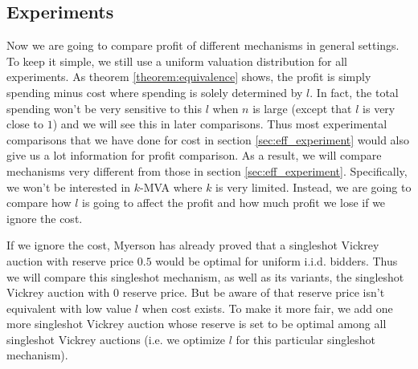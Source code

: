 \subsection{Experiments}

Now we are going to compare profit of different mechanisms in general settings.
To keep it simple, we still use a uniform valuation distribution for all
experiments.  As theorem \ref{theorem:equivalence} shows, the profit is simply
spending minus cost where spending is solely determined by $l$. In fact, the
total spending won't be very sensitive to this $l$ when $n$ is large (except
that $l$ is very close to $1$) and we will see this in later comparisons. Thus
most experimental comparisons that we have done for cost in section
\ref{sec:eff_experiment} would also give us a lot information for profit
comparison. As a result, we will compare mechanisms very different from those
in section \ref{sec:eff_experiment}. Specifically, we won't be interested in
$k$-MVA where $k$ is very limited. Instead, we are going to compare how $l$
is going to affect the profit and how much profit we lose if we ignore the cost.

If we ignore the cost, Myerson has already proved that a singleshot Vickrey
auction with reserve price $0.5$ would be optimal for uniform i.i.d. bidders.
Thus we will compare this singleshot mechanism, as well as its variants, the
singleshot Vickrey auction with $0$ reserve price. But be aware of that reserve
price isn't equivalent with low value $l$  when cost exists. To make it more fair,
we add one more singleshot Vickrey auction whose reserve is set to be optimal
among all singleshot Vickrey auctions (i.e. we optimize $l$ for this particular
singleshot mechanism).

